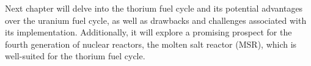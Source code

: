 Next chapter will delve into the thorium fuel cycle and its potential advantages over the uranium fuel cycle, as well as drawbacks and challenges associated with its implementation. Additionally, it will explore a promising prospect for the fourth generation of nuclear reactors, the molten salt reactor (MSR), which is well-suited for the thorium fuel cycle.